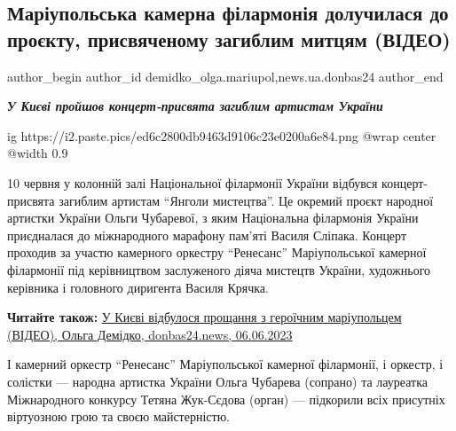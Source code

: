  
 
 
 
 
 
\subsection{Маріупольська камерна філармонія долучилася до проєкту, присвяченому загиблим митцям (ВІДЕО)}
\label{sec:12_06_2023.stz.news.ua.donbas24.1.mariupol_kamerna_filarmonia_proekt_zagybli_mytci}
 
\ifcmt
 author_begin
   author_id demidko_olga.mariupol,news.ua.donbas24
 author_end
\fi

\begin{center}
\Large\bfseries\em\color{blue}
У Києві пройшов концерт-присвята загиблим артистам України
\end{center}

\ifcmt
  ig https://i2.paste.pics/ed6c2800db9463d9106c23e0200a6e84.png
  @wrap center
  @width 0.9
\fi

10 червня у колонній залі Національної філармонії України відбувся
концерт-присвята загиблим артистам \enquote{Янголи мистецтва}. Це окремий проєкт
народної артистки України Ольги Чубаревої, з яким Національна філармонія
України приєдналася до міжнародного марафону пам'яті Василя Сліпака. Концерт
проходив за участю камерного оркестру \enquote{Ренесанс} Маріупольської камерної
філармонії під керівництвом заслуженого діяча мистецтв України, художнього
керівника і головного диригента Василя Крячка. 

\textbf{Читайте також:} \href{https://donbas24.news/news/u-kijevi-vidbulosya-proshhannya-z-geroyicnim-mariupolcem}{У Києві відбулося прощання з героїчним маріупольцем (ВІДЕО), Ольга Демідко, donbas24.news, 06.06.2023}

І камерний оркестр \enquote{Ренесанс} Маріупольської камерної філармонії, і оркестр, і
солістки — народна артистка України Ольга Чубарева (сопрано) та лауреатка
Міжнародного конкурсу Тетяна Жук-Сєдова (орган) — підкорили всіх присутніх
віртуозною грою та своєю майстерністю.

